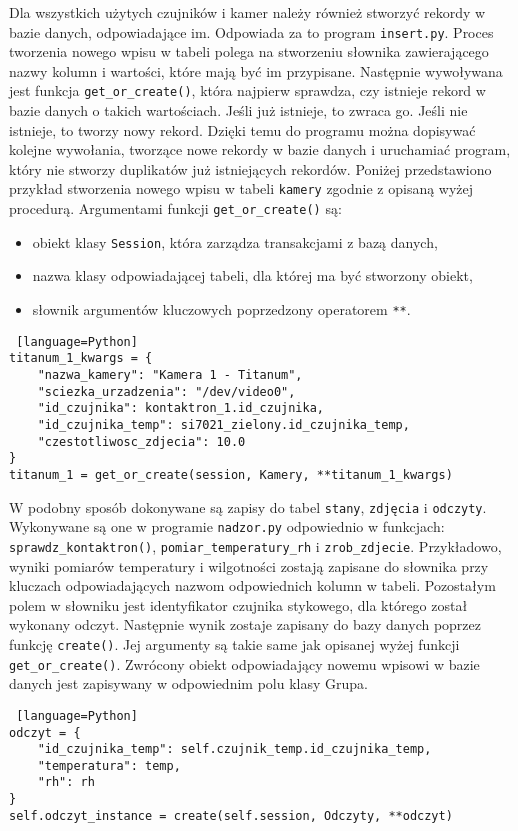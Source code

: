 \documentclass[a4paper,11pt,twoside]{article}
\begin{document}
Dla wszystkich użytych czujników i kamer należy również stworzyć rekordy w bazie danych, odpowiadające im. Odpowiada za to program \texttt{insert.py}. Proces tworzenia nowego wpisu w tabeli polega na stworzeniu słownika zawierającego nazwy kolumn i wartości, które mają być im przypisane. Następnie wywoływana jest funkcja \texttt{get{\_}or{\_}create()}, która najpierw sprawdza, czy istnieje rekord w bazie danych o takich wartościach. Jeśli już istnieje, to zwraca go. Jeśli nie istnieje, to tworzy nowy rekord. Dzięki temu do programu można dopisywać kolejne wywołania, tworzące nowe rekordy w bazie danych i uruchamiać program, który nie stworzy duplikatów już istniejących rekordów. Poniżej przedstawiono przykład stworzenia nowego wpisu w tabeli \texttt{kamery} zgodnie z opisaną wyżej procedurą. Argumentami funkcji \texttt{get{\_}or{\_}create()} są:
\begin{itemize}
\item obiekt klasy \texttt{Session}, która zarządza transakcjami z bazą danych\cite{sqlalchemy-session},
\item nazwa klasy odpowiadającej tabeli, dla której ma być stworzony obiekt,
\item słownik argumentów kluczowych poprzedzony operatorem \texttt{**}.
\end{itemize}
\begin{lstlisting} [language=Python]
titanum_1_kwargs = {
    "nazwa_kamery": "Kamera 1 - Titanum",
    "sciezka_urzadzenia": "/dev/video0",
    "id_czujnika": kontaktron_1.id_czujnika,
    "id_czujnika_temp": si7021_zielony.id_czujnika_temp,
    "czestotliwosc_zdjecia": 10.0
}
titanum_1 = get_or_create(session, Kamery, **titanum_1_kwargs)
\end{lstlisting}

W podobny sposób dokonywane są zapisy do tabel \texttt{stany}, \texttt{zdjęcia} i \texttt{odczyty}. Wykonywane są one w programie \texttt{nadzor.py} odpowiednio w funkcjach: \linebreak\texttt{sprawdz{\_}kontaktron()}, \texttt{pomiar{\_}temperatury{\_}rh} i \texttt{zrob{\_}zdjecie}. Przykładowo, wyniki pomiarów temperatury i wilgotności zostają zapisane do słownika przy kluczach odpowiadających nazwom odpowiednich kolumn w tabeli. Pozostałym polem w słowniku jest identyfikator czujnika stykowego, dla którego został wykonany odczyt. Następnie wynik zostaje zapisany do bazy danych poprzez funkcję \texttt{create()}. Jej argumenty są takie same jak opisanej wyżej funkcji \texttt{get{\_}or{\_}create()}. Zwrócony obiekt odpowiadający nowemu wpisowi w bazie danych jest zapisywany w odpowiednim polu klasy Grupa.
\begin{lstlisting} [language=Python]
odczyt = {
	"id_czujnika_temp": self.czujnik_temp.id_czujnika_temp,
	"temperatura": temp,
	"rh": rh
}
self.odczyt_instance = create(self.session, Odczyty, **odczyt)
\end{lstlisting}
\end{document}
